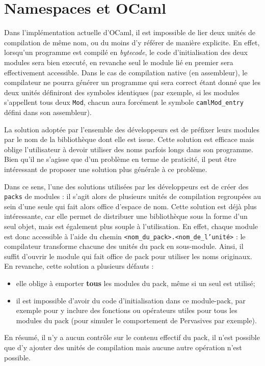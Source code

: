\documentclass[11pt,a4paper]{report}
\begin{document}
\section{Namespaces et OCaml}

Dans l'implémentation actuelle d'OCaml, il est impossible de lier deux unités de
compilation de même nom, ou du moins d'y référer de manière explicite. En effet,
lorsqu'un programme est compilé en \emph{bytecode}, le code d'initialisation des
deux modules sera bien executé, en revanche seul le module lié en premier sera
effectivement accessible. Dans le cas de compilation native (en assembleur), le
compilateur ne pourra générer un programme qui sera correct étant donné que les
deux unités définiront des symboles identiques (par exemple, si les modules
s'appellent tous deux \texttt{Mod}, chacun aura forcément le symbole
\texttt{camlMod_entry} défini dans son assembleur).

La solution adoptée par l'ensemble des développeurs est de préfixer leurs
modules par le nom de la bibliothèque dont elle est issue. Cette solution est
efficace mais oblige l'utilisateur à devoir utiliser des noms parfois longs dans
son programme. Bien qu'il ne s'agisse que d'un problème en terme de praticité,
il peut être intéressant de proposer une solution plus générale à ce problème.

Dans ce sens, l'une des solutions utilisées par les développeurs est de créer
des \texttt{packs} de modules : il s'agit alors de plusieurs unités de
compilation regroupées au sein d'une seule qui fait alors office d'espace de
nom. Cette solution est déjà plus intéressante, car elle permet de distribuer
une bibliothèque sous la forme d'un seul objet, mais est également plus souple à
l'utilisation. En effet, chaque module est donc accessible à l'aide du chemin
\texttt{<nom\_du\_pack>.<nom\_de\_l'unité>} : le compilateur transforme chacune
des unités du pack en sous-module. Ainsi, il suffit d'ouvrir le module qui fait
office de pack pour utiliser les noms originaux. En revanche, cette solution a
plusieurs défauts :
\begin{itemize}
\item elle oblige à emporter \textbf{tous} les modules du pack, même si un seul
  est utilisé;
\item il est impossible d'avoir du code d'initialisation dans ce module-pack,
  par exemple pour y inclure des fonctions ou opérateurs utiles pour tous les
  modules du pack (pour simuler le comportement de Pervasives par exemple).
\end{itemize}
En résumé, il n'y a aucun contrôle sur le contenu effectif du pack, il n'est
possible que d'y ajouter des unités de compilation mais aucune autre opération
n'est possible.
\end{document}
